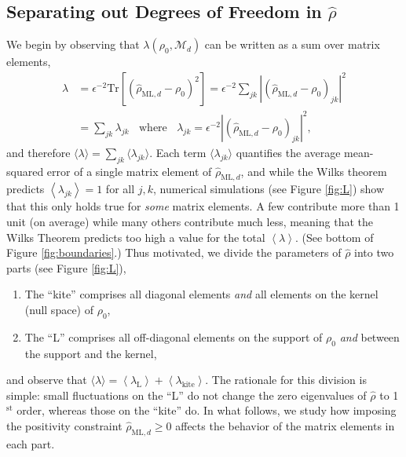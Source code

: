 \documentclass[aps,pra, twocolumn]{revtex4-1}
\newcommand{\M}{\mathcal{M}}
\newcommand{\expect}[1]{\ensuremath{\left\langle#1\right\rangle}}
\newcommand{\rhohat}{\hat{\rho}}
\newcommand{\rhoML}[1]{\rhohat_{\scriptscriptstyle{\mathrm{ML},#1}}}
\begin{document}
\subsection{Separating out Degrees of Freedom in $\rhohat$}

We begin by observing that $\lambda(\rho_{0}, \M_{d})$ can be written as a sum over matrix elements,
\begin{align}
\label{eq:llrserrors}
\nonumber \lambda &=\epsilon^{-2}\mathrm{Tr}[(\rhoML{d} - \rho_{0})^{2}] = \epsilon^{-2}\sum_{jk}|(\rhoML{d}- \rho_{0} )_{jk}|^{2}\\
&= \sum_{jk}\lambda_{jk}~~~~\text{where}~~~~\lambda_{jk} = \epsilon^{-2}|(\rhoML{d} - \rho_{0} )_{jk} |^{2},
\end{align}
and therefore $\langle \lambda \rangle = \sum_{jk}\langle\lambda_{jk}\rangle$.  Each term $\langle \lambda_{jk}\rangle$ quantifies the average mean-squared error of a single matrix element of $\rhoML{d}$, and while the Wilks theorem predicts $\expect{\lambda_{jk}}=1$ for all $j,k$, numerical simulations (see Figure \ref{fig:L}) show that this only holds true for \emph{some} matrix elements.  A few contribute more than 1 unit (on average) while many others contribute much less, meaning that the Wilks Theorem predicts too high a value for the total $\expect{\lambda}$.  (See bottom of Figure \ref{fig:boundaries}.) Thus motivated, we divide the parameters of $\rhohat$ into two parts (see Figure \ref{fig:L}),
\begin{enumerate}[noitemsep]
\item The ``kite'' comprises all diagonal elements \emph{and} all elements on the kernel (null space) of $\rho_0$,
\item The ``L'' comprises all off-diagonal elements on the support of $\rho_0$ \emph{and} between the support and the kernel,
\end{enumerate}
and observe that $\langle\lambda\rangle = \expect{\lambda_{\mathrm{L}}} + \expect{\lambda_{\mathrm{kite}}}$.  The rationale for this division is simple:  small fluctuations on the ``L'' do not change the zero eigenvalues of $\hat\rho$ to 1$^{\mathrm{st}}$ order, whereas those on the ``kite'' do. In what follows, we study how imposing the positivity constraint $\rhoML{d} \geq 0$ affects the behavior of the matrix elements in each part.
\end{document}
